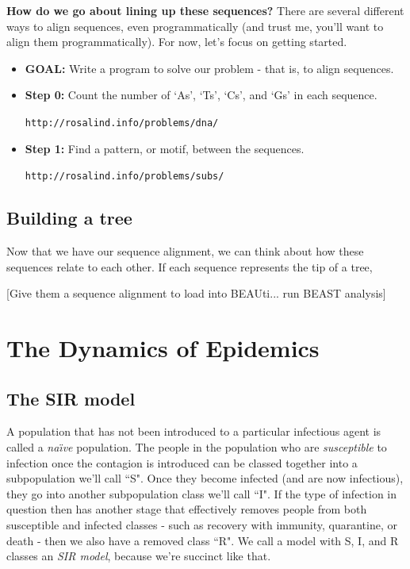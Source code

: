 \documentclass{scrartcl}
\begin{document}
\vspace{2mm}

\vspace{2mm}
\textbf{How do we go about lining up these sequences?}  There are several different ways to align sequences, even programmatically (and trust me, you'll 
want to align them programmatically).  For now, let's focus on getting started.  

\begin{itemize}
\item \textbf{GOAL:}  Write a program to solve our problem - that is, to align sequences.
\item \textbf{Step 0:}  Count the number of `As', `Ts', `Cs', and `Gs' in each sequence. 

\texttt{http://rosalind.info/problems/dna/}
\item \textbf{Step 1:}  Find a pattern, or motif, between the sequences. 

\texttt{http://rosalind.info/problems/subs/}
\end{itemize}


\subsection{Building a tree}

Now that we have our sequence alignment, we can think about how these sequences relate to each other.  If each sequence represents the tip of a tree,

\vspace{2mm}
[Give them a sequence alignment to load into BEAUti... run BEAST analysis]

\section{The Dynamics of Epidemics}

\subsection{The SIR model}

A population that has not been introduced to a particular infectious agent is called a \textit{na\"\i ve} population.  The people in the population who are 
\textit{susceptible} to infection once the contagion is introduced can be classed together into a subpopulation we'll call ``S".  Once they become 
infected (and are now infectious), they go into another subpopulation class we'll call ``I".  If the type of infection in question then has 
another stage that effectively removes people from both susceptible and infected classes - such as recovery with immunity, quarantine, or death - 
then we also have a removed class ``R".  We call a model with S, I, and R classes an \textit{SIR model}, because we're succinct like that. 
\end{document}

